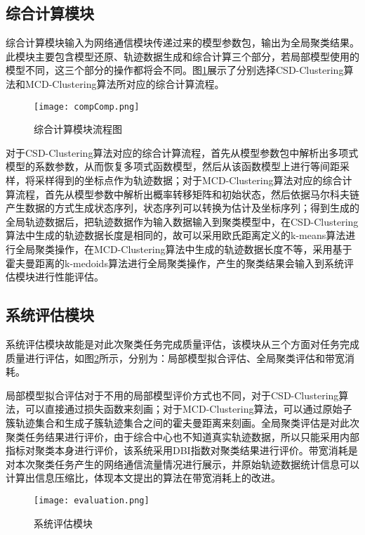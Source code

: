 \subsection{综合计算模块}

综合计算模块输入为网络通信模块传递过来的模型参数包，输出为全局聚类结果。此模块主要包含模型还原、轨迹数据生成和综合计算三个部分，若局部模型使用的模型不同，这三个部分的操作都将会不同。图\ref{compComp}展示了分别选择CSD-Clustering算法和MCD-Clustering算法所对应的综合计算流程。
\begin{figure}[H]
	\texttt{[image: compComp.png]}
	\caption{综合计算模块流程图}
	\label{compComp}
\end{figure}

对于CSD-Clustering算法对应的综合计算流程，首先从模型参数包中解析出多项式模型的系数参数，从而恢复多项式函数模型，然后从该函数模型上进行等间距采样，将采样得到的坐标点作为轨迹数据；对于MCD-Clustering算法对应的综合计算流程，首先从模型参数中解析出概率转移矩阵和初始状态，然后依据马尔科夫链产生数据的方式生成状态序列，状态序列可以转换为估计及坐标序列；得到生成的全局轨迹数据后，把轨迹数据作为输入数据输入到聚类模型中，在CSD-Clustering算法中生成的轨迹数据长度是相同的，故可以采用欧氏距离定义的k-means算法进行全局聚类操作，在MCD-Clustering算法中生成的轨迹数据长度不等，采用基于霍夫曼距离的k-medoids算法进行全局聚类操作，产生的聚类结果会输入到系统评估模块进行性能评估。

\subsection{系统评估模块}

系统评估模块故能是对此次聚类任务完成质量评估，该模块从三个方面对任务完成质量进行评估，如图\ref{evaluation}所示，分别为：局部模型拟合评估、全局聚类评估和带宽消耗。

局部模型拟合评估对于不用的局部模型评价方式也不同，对于CSD-Clustering算法，可以直接通过损失函数来刻画；对于MCD-Clustering算法，可以通过原始子簇轨迹集合和生成子簇轨迹集合之间的霍夫曼距离来刻画。全局聚类评估是对此次聚类任务结果进行评价，由于综合中心也不知道真实轨迹数据，所以只能采用内部指标对聚类本身进行评价，该系统采用DBI指数对聚类结果进行评价。带宽消耗是对本次聚类任务产生的网络通信流量情况进行展示，并原始轨迹数据统计信息可以计算出信息压缩比，体现本文提出的算法在带宽消耗上的改进。
\begin{figure}[H]
	\texttt{[image: evaluation.png]}
	\caption{系统评估模块}
	\label{evaluation}
\end{figure}


